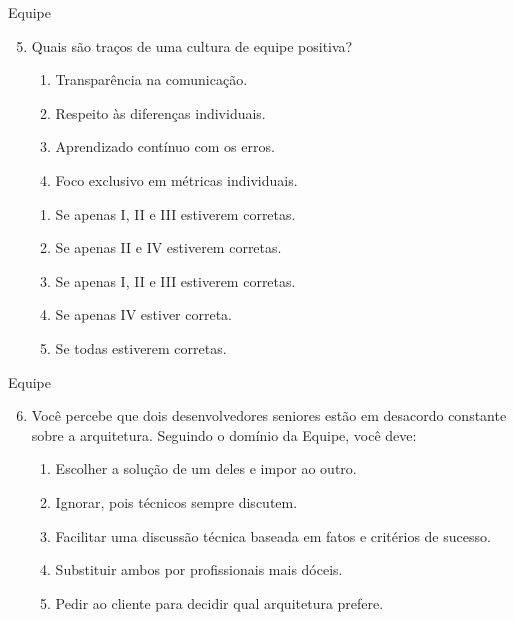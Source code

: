 \documentclass{beamer}
\begin{document}
\begin{frame}{Equipe}
	\begin{enumerate}
		\setcounter{enumi}{4}
		\justifying
		\item Quais são traços de uma cultura de equipe positiva?
		\begin{enumerate}[I]
			\item Transparência na comunicação.
			\item Respeito às diferenças individuais.
			\item Aprendizado contínuo com os erros.
			\item Foco exclusivo em métricas individuais.
		\end{enumerate}
		\begin{enumerate}[a]
			\item Se apenas I, II e III estiverem corretas.
			\item Se apenas II e IV estiverem corretas.
			\item \alert<2>{Se apenas I, II e III estiverem corretas.}
			\item Se apenas IV estiver correta.
			\item Se todas estiverem corretas.
		\end{enumerate}
	\end{enumerate}
\end{frame}

\begin{frame}{Equipe}
	\begin{enumerate}
		\setcounter{enumi}{5}
		\justifying
		\item Você percebe que dois desenvolvedores seniores estão em desacordo constante sobre a arquitetura. Seguindo o domínio da Equipe, você deve:
		\begin{enumerate}[a]
			\item Escolher a solução de um deles e impor ao outro.
			\item Ignorar, pois técnicos sempre discutem.
			\item \alert<2>{Facilitar uma discussão técnica baseada em fatos e critérios de sucesso.}
			\item Substituir ambos por profissionais mais dóceis.
			\item Pedir ao cliente para decidir qual arquitetura prefere.
		\end{enumerate}
	\end{enumerate}
\end{frame}

\end{document}
